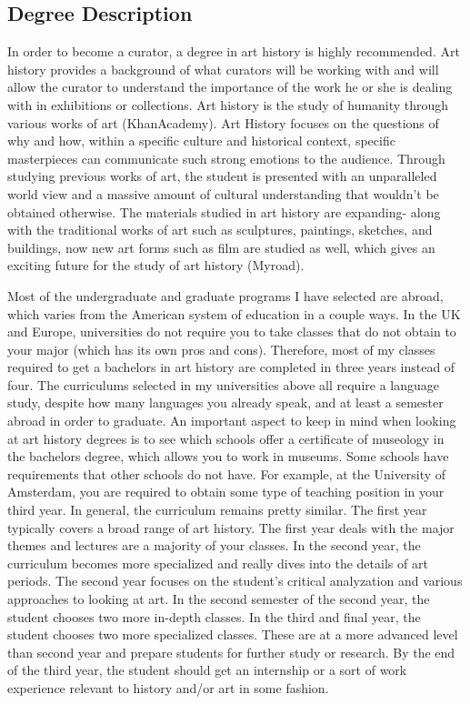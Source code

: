 \begin{multicols}{2}

\section{Degree Description}
	In order to become a curator, a degree in art history is highly recommended. Art history provides a background of what curators will be working with and will allow the curator to understand the importance of the work he or she is dealing with in exhibitions or collections. Art history is the study of humanity through various works of art (KhanAcademy). Art History focuses on the questions of why and how, within a specific culture and historical context, specific masterpieces can communicate such strong emotions to the audience. Through studying previous works of art, the student is presented with an unparalleled world view and a massive amount of cultural understanding that wouldn’t be obtained otherwise. The materials studied in art history are expanding- along with the traditional works of art such as sculptures, paintings, sketches, and buildings, now new art forms such as film are studied as well, which gives an exciting future for the study of art history (Myroad). 

	Most of the undergraduate and graduate programs I have selected are abroad, which varies from the American system of education in a couple ways. In the UK and Europe, universities do not require you to take classes that do not obtain to your major (which has its own pros and cons). Therefore, most of my classes required to get a bachelors in art history are completed in three years instead of four. The curriculums selected in my universities above all require a language study, despite how many languages you already speak, and at least a semester abroad in order to graduate. An important aspect to keep in mind when looking at art history degrees is to see which schools offer a certificate of museology in the bachelors degree, which allows you to work in museums. Some schools have requirements that other schools do not have. For example, at the University of Amsterdam, you are required to obtain some type of teaching position in your third year. In general, the curriculum remains pretty similar. The first year typically covers a broad range of art history. The first year deals with the major themes and lectures are a majority of your classes. In the second year, the curriculum becomes more specialized and really dives into the details of art periods. The second year focuses on the student’s critical analyzation and various approaches to looking at art. In the second semester of the second year, the student chooses two more in-depth classes. In the third and final year, the student chooses two more specialized classes. These are at a more advanced level than second year and prepare students for further study or research. By the end of the third year, the student should get an internship or a sort of work experience relevant to history and/or art in some fashion. 


\end{multicols}
